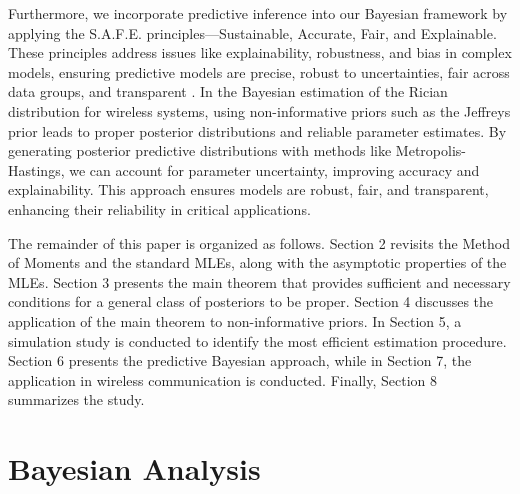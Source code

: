 \documentclass[12pt]{interact}
\theoremstyle{plain}%
\theoremstyle{definition}
\theoremstyle{remark}
\begin{document}
Furthermore, we incorporate predictive inference into our Bayesian framework by applying the S.A.F.E. principles—Sustainable, Accurate, Fair, and Explainable. These principles address issues like explainability, robustness, and bias in complex models, ensuring predictive models are precise, robust to uncertainties, fair across data groups, and transparent \cite{giudici2023safe,giudici2024safe}. In the Bayesian estimation of the Rician distribution for wireless systems, using non-informative priors such as the Jeffreys prior leads to proper posterior distributions and reliable parameter estimates. By generating posterior predictive distributions with methods like Metropolis-Hastings, we can account for parameter uncertainty, improving accuracy and explainability. This approach ensures models are robust, fair, and transparent, enhancing their reliability in critical applications.

The remainder of this paper is organized as follows. Section 2 revisits the Method of Moments and the standard MLEs, along with the asymptotic properties of the MLEs. Section 3 presents the main theorem that provides sufficient and necessary conditions for a general class of posteriors to be proper. Section 4 discusses the application of the main theorem to non-informative priors. In Section 5, a simulation study is conducted to identify the most efficient estimation procedure. Section 6 presents the predictive Bayesian approach, while in Section 7, the application in wireless communication is conducted. Finally, Section 8 summarizes the study.














\section{Bayesian Analysis}
\end{document}
